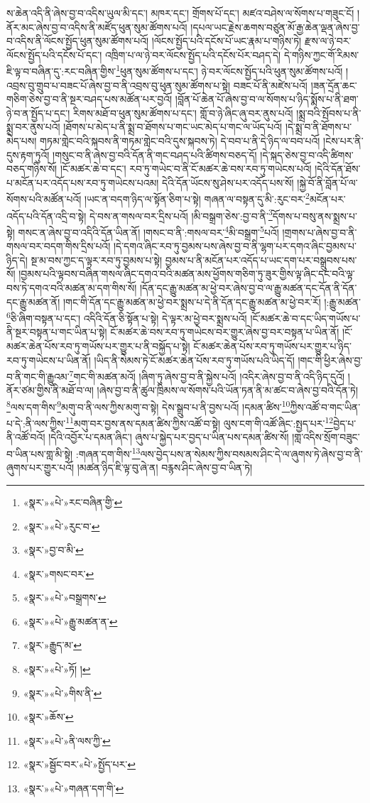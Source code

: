 ས་ཆེན་འདི་ནི་ཞེས་བྱ་བ་འདིས་ཡུལ་མི་དང་། མཁར་དང་། གྲོགས་པོ་དང་། མཛའ་བཤེས་ལ་སོགས་པ་གཟུང་ངོ། །ནོར་མང་ཞེས་བྱ་བ་འདིས་ནི་མཛོད་ཕུན་སུམ་ཚོགས་པའོ། །དཔལ་ཡང་རྗེས་ཆགས་བཙུན་མོ་རྒྱ་ཆེན་ལྡན་ཞེས་བྱ་བ་འདིས་ནི་ལོངས་སྤྱོད་ཕུན་སུམ་ཚོགས་པའོ། །ལོངས་སྤྱོད་པའི་དངོས་པོ་ཡང་རྣམ་པ་གཉིས་ཏེ། རྫས་ལ་ཉེ་བར་ལོངས་སྤྱོད་པའི་དངོས་པོ་དང་། འཁྲིག་པ་ལ་ཉེ་བར་ལོངས་སྤྱོད་པའི་དངོས་པོར་བཤད་དེ། དེ་གཉིས་ཀྱང་གོ་རིམས་ཇི་ལྟ་བ་བཞིན་དུ་:རང་བཞིན་གྱིས་\footnote{«སྣར་»«པེ་»རང་བཞིན་གྱི་}ཕུན་སུམ་ཚོགས་པ་དང་། ཉེ་བར་ལོངས་སྤྱོད་པའི་ཕུན་སུམ་ཚོགས་པའོ། །འབྲས་བུ་གྲུབ་པ་བཟང་པོ་ཞེས་བྱ་བ་ནི་འབྲས་བུ་ཕུན་སུམ་ཚོགས་པ་སྟེ། བཟང་པོ་ནི་མཛེས་པའོ། །ཟན་དྲོན་ཆང་གཅིག་ཅེས་བྱ་བ་ནི་སྔར་བཤད་པས་མཚོན་པར་བྱའོ། །བློན་པོ་ཆེན་པོ་ཞེས་བྱ་བ་ལ་སོགས་པ་ཉིད་སྨོས་པ་ནི་ཐག་ཉེ་བ་ན་སྤྱོད་པ་དང་། རིགས་མཐོ་བ་ཕུན་སུམ་ཚོགས་པ་དང་། གློ་བ་ཉེ་ཞིང་ཞུ་བར་ནུས་པའོ། །སྨྲ་བའི་སྤོབས་པ་ནི་སྨྲ་བར་ནུས་པའོ། །ཐོགས་པ་མེད་པ་ནི་སྨྲ་བ་ཐོགས་པ་གང་ཡང་མེད་པ་གང་ལ་ཡོད་པའོ། །དེ་སྨྲ་བ་ནི་ཐོགས་པ་མེད་པས། གཏམ་གླེང་བའི་སྐབས་ནི་གཏམ་གླེང་བའི་དུས་སྐབས་ཏེ། དེ་བབ་པ་ནི་དེ་ཉིད་ལ་བབ་པའོ། །ངེས་པར་ནི་དུས་རྟག་ཏུའོ། །གསུང་བ་ནི་ཞེས་བྱ་བའི་དོན་ནི་གང་བཤད་པའི་ཚིགས་བཅད་དོ། །དེ་སྐད་ཅེས་བྱ་བ་འདི་ཚིགས་བཅད་གཉིས་སོ། །ངོ་མཚར་ཆེ་བ་དང་། རབ་ཏུ་གཡེང་བ་ནི་ངོ་མཚར་ཆེ་བས་རབ་ཏུ་གཡེངས་པའོ། །དེའི་དོན་ཐོས་པ་མངོན་པར་འདོད་པས་རབ་ཏུ་གཡེངས་པའམ། དེའི་དོན་ཡོངས་སུ་ཤེས་པར་འདོད་པས་སོ། །སྐྱེ་བོ་ནི་བློན་པོ་ལ་སོགས་པའི་མཚོན་པའོ། །ཡང་ན་བདག་ཉིད་ལ་སྟོན་ཅིག་པ་སྟེ། གཞན་ལ་བསྟན་དུ་མི་:རུང་བར་\footnote{«སྣར་»«པེ་»རུང་བ་}མངོན་པར་འདོད་པའི་དོན་འདྲི་བ་སྟེ། དེ་བས་ན་གསལ་བར་དྲིས་པའོ། །མི་བསྒྲག་ཅེས་:བྱ་བ་ནི་\footnote{«སྣར་»བྱ་བ་མི་}དོགས་པ་བསུ་ནས་སྨྲས་པ་སྟེ། གསང་ན་ཞེས་བྱ་བ་འདིའི་དོན་ཡིན་ནོ། །གསང་བ་ནི་:གསལ་བར་\footnote{«སྣར་»གསང་བར་}མི་བསྒྲག་\footnote{«སྣར་»«པེ་»བསྒྲགས་}པའོ། །གྲགས་པ་ཞེས་བྱ་བ་ནི་གསལ་བར་བདག་གིས་དྲིས་པའོ། །དེ་དགའ་ཞིང་རབ་ཏུ་བྱམས་པས་ཞེས་བྱ་བ་ནི་ལྷག་པར་དགའ་ཞིང་བྱམས་པ་ཉིད་དེ། སྔ་མ་བས་ཀྱང་ད་ལྟར་རབ་ཏུ་བྱམས་པ་སྟེ། བྱམས་པ་ནི་མངོན་པར་འདོད་པ་ཡང་དག་པར་བསྒྲུབས་པས་སོ། །བྱམས་པའི་ལྟབས་བཞིན་གསལ་ཞིང་དགའ་བའི་མཚན་མས་ཕྱོགས་གཅིག་ཏུ་ཟུར་གྱིས་ལྟ་ཞིང་དང་བའི་ལྟ་བས་ཏེ་དགའ་བའི་མཚན་མ་དག་གིས་སོ། །དོན་དང་རྒྱུ་མཚན་མ་ཕྱེ་བར་ཞེས་བྱ་བ་ལ་རྒྱུ་མཚན་དང་དོན་ནི་དོན་དང་རྒྱུ་མཚན་ནོ། །གང་གི་དོན་དང་རྒྱུ་མཚན་མ་ཕྱེ་བར་སྨྲས་པ་དེ་ནི་དོན་དང་རྒྱུ་མཚན་མ་ཕྱེ་བར་རོ། །:རྒྱུ་མཚན་\footnote{«སྣར་»«པེ་»རྒྱུ་མཚན་ན་}ཅི་ཞིག་བསྟན་པ་དང་། འདིའི་དོན་ཅི་སྟོན་པ་སྟེ། དེ་ལྟར་མ་ཕྱེ་བར་སྨྲས་པའོ། །ངོ་མཚར་ཆེ་བ་དང་ཡིད་གཡོས་པ་ནི་སྔར་བསྟན་པ་གང་ཡིན་པ་སྟེ། ངོ་མཚར་ཆེ་བས་རབ་ཏུ་གཡེངས་བར་གྱུར་ཞེས་བྱ་བར་བསྟན་པ་ཡིན་ནོ། །ངོ་མཚར་ཆེན་པོས་རབ་ཏུ་གཡོས་པར་གྱུར་པ་ནི་བསྐྱོད་པ་སྟེ། ངོ་མཚར་ཆེན་པོས་རབ་ཏུ་གཡོས་པར་གྱུར་པ་ཉིད་རབ་ཏུ་གཡེངས་པ་ཡིན་ནོ། །ཡིད་ནི་སེམས་ཏེ་ངོ་མཚར་ཆེན་པོས་རབ་ཏུ་གཡོས་པའི་ཡིད་དོ། །གང་གི་ཕྱིར་ཞེས་བྱ་བ་ནི་གང་གི་རྒྱུའམ་\footnote{«སྣར་»རྒྱུད་མ་}གང་གི་མཚན་མའོ། །ཞིག་ཏུ་ཞེས་བྱ་བ་ནི་སྐྱེས་པའོ། །འདིར་ཞེས་བྱ་བ་ནི་འདི་ཉིད་དུའོ། །ནོར་ཙམ་གྱིས་ནི་མཐོ་བ་ལ། །ཞེས་བྱ་བ་ནི་ཚུལ་ཁྲིམས་ལ་སོགས་པའི་ཡོན་ཏན་ནི་མ་ཚང་བ་ཞེས་བྱ་བའི་དོན་ཏེ། \footnote{«སྣར་»«པེ་»ཏོ། ། }ལས་དག་གིས་\footnote{«སྣར་»«པེ་»གིས་ནི་}མགུ་བ་ནི་ལས་ཀྱིས་མགུ་བ་སྟེ། དེས་སྒྲུབ་པ་ནི་བྱས་པའོ། །དམན་ཚིས་\footnote{«སྣར་»ཆོས་}ཀྱིས་འཚོ་བ་གང་ཡིན་པ་དེ་:ནི་ལས་ཀྱིས་\footnote{«སྣར་»«པེ་»ནི་ལས་ཀྱི་}མགུ་བར་བྱས་ནས་དམན་ཚིས་ཀྱིས་འཚོ་བ་སྟེ། ལུས་ངག་གི་འཚོ་ཞིང་:སྤྱད་པར་\footnote{«སྣར་»སྦྱོང་བར་«པེ་»སྤྱོད་པར་}བྱེད་པ་ནི་འཚོ་བའོ། །དེའི་འབྱོར་པ་དམན་ཞིང་། ཞུས་པ་སྐྱེད་པར་བྱད་པ་ཡིན་པས་དམན་ཚིས་སོ། །གླ་འདིས་སྲོག་བཟུང་བ་ཡིན་པས་གླ་མི་སྟེ། :གཞན་དག་གིས་\footnote{«སྣར་»«པེ་»གཞན་དག་གི་}ལས་བྱེད་པས་ན་སེམས་ཀྱིས་བསམས་ཤིང་དེ་ལ་ཞུགས་ཏེ་ཞེས་བྱ་བ་ནི་ཞུགས་པར་གྱུར་པའོ། །མཚན་ཉིད་ཇི་ལྟ་བུ་ཞེ་ན། བརྙས་ཤིང་ཞེས་བྱ་བ་ཡིན་ཏེ། 